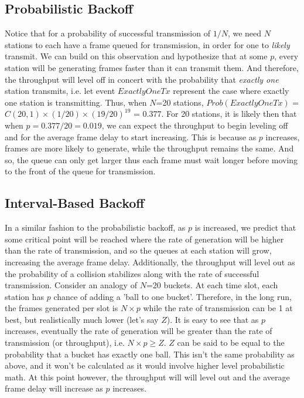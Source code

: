 \documentclass[twocolumn]{article}
\begin{document}
\subsection*{Probabilistic Backoff} Notice that for a probability of successful
transmission of $1/N$, we need $N$ stations to each have a frame queued for
transmission, in order for one to \emph{likely} transmit. We can build on this
observation and hypothesize that at some $p$, every station will be generating
frames faster than it can transmit them. And therefore, the throughput will
level off in concert with the probability that \emph{exactly one} station
transmits, i.e. let event $ExactlyOneTx$ represent the case where exactly one
station is transmitting. Thus, when $N$=20 stations, $Prob(ExactlyOneTx)$ =
$C(20,1)\times(1/20)\times(19/20)^{19}$ = 0.377. For 20 stations, it is likely
then that when $p=0.377/20=0.019$, we can expect the throughput to begin
leveling off and for the average frame delay to start increasing. This is
because as $p$ increases, frames are more likely to generate, while the
throughput remains the same. And so, the queue can only get larger thus each
frame must wait longer before moving to the front of the queue for transmission.

\subsection*{Interval-Based Backoff} In a similar fashion to the probabilistic
backoff, as $p$ is increased, we predict that some critical point will be reached
where the rate of generation will be higher than the rate of transmission, and so the
queues at each station will grow, increasing the average frame delay. Additionally,
the throughput will level out as the probability of a collision stabilizes along with
the rate of successful transmission. Consider an analogy of $N$=20 buckets. At each time
slot, each station has $p$ chance of adding a 'ball to one bucket'. Therefore, in the
long run, the frames generated per slot is $N\times p$ while the rate of transmission
can be 1 at best, but realistically much lower (let's say $Z$). It is easy to see that
as $p$ increases, eventually the rate of generation will be greater than the rate of
transmission (or throughput), i.e. $N\times p \geq Z$. $Z$ can be said to be equal to
the probability that a bucket has exactly one ball. This isn't the same probability as
above, and it won't be calculated as it would involve higher level probabilistic math.
At this point however, the throughput will will level out and the average frame delay will increase
as $p$ increases.
\end{document}
